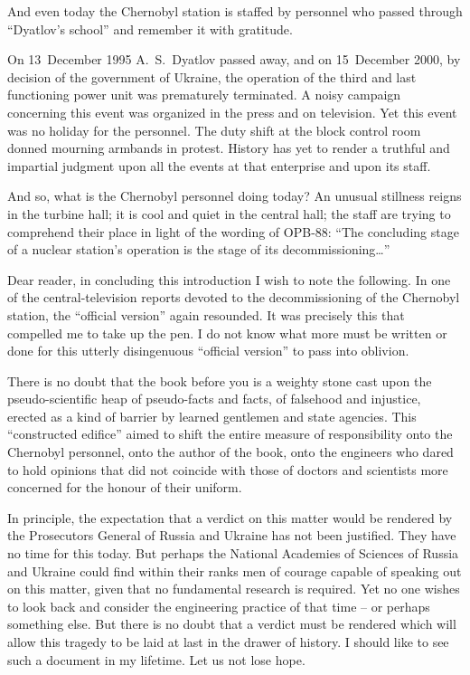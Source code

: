 \documentclass[openright]{bookest}
\begin{document}
And even today the Chernobyl station is staffed by personnel who passed through ``Dyatlov's school'' and remember it with gratitude.

On 13~December 1995 A.~S.~Dyatlov passed away, and on 15~December 2000, by decision of the government of Ukraine, the operation of the third and last functioning power unit was prematurely terminated. A noisy campaign concerning this event was organized in the press and on television. Yet this event was no holiday for the personnel. The duty shift at the block control room donned mourning armbands in protest. History has yet to render a truthful and impartial judgment upon all the events at that enterprise and upon its staff.

And so, what is the Chernobyl personnel doing today? An unusual stillness reigns in the turbine hall; it is cool and quiet in the central hall; the staff are trying to comprehend their place in light of the wording of OPB-88: ``The concluding stage of a nuclear station's operation is the stage of its decommissioning\ldots''

Dear reader, in concluding this introduction I wish to note the following. In one of the central-television reports devoted to the decommissioning of the Chernobyl station, the ``official version'' again resounded. It was precisely this that compelled me to take up the pen. I do not know what more must be written or done for this utterly disingenuous ``official version'' to pass into oblivion.

There is no doubt that the book before you is a weighty stone cast upon the pseudo-scientific heap of pseudo-facts and facts, of falsehood and injustice, erected as a kind of barrier by learned gentlemen and state agencies. This ``constructed edifice'' aimed to shift the entire measure of responsibility onto the Chernobyl personnel, onto the author of the book, onto the engineers who dared to hold opinions that did not coincide with those of doctors and scientists more concerned for the honour of their uniform.

In principle, the expectation that a verdict on this matter would be rendered by the Prosecutors General of Russia and Ukraine has not been justified. They have no time for this today. But perhaps the National Academies of Sciences of Russia and Ukraine could find within their ranks men of courage capable of speaking out on this matter, given that no fundamental research is required. Yet no one wishes to look back and consider the engineering practice of that time -- or perhaps something else. But there is no doubt that a verdict must be rendered which will allow this tragedy to be laid at last in the drawer of history. I should like to see such a document in my lifetime. Let us not lose hope.
\end{document}
